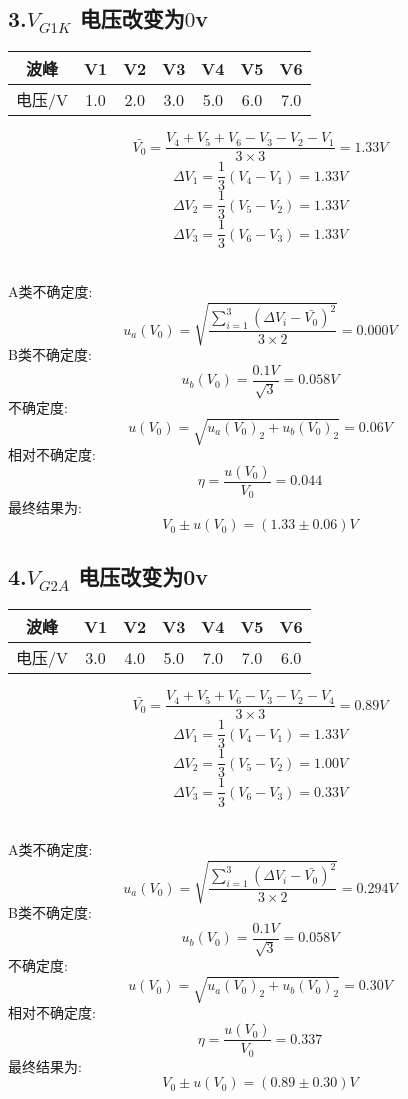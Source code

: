 \documentclass[11pt,a4paper,oneside]{article}
\begin{document}
\subsection*{3.$V_{G1K}$ 电压改变为$0$v}
\begin{center}
\begin{tabular}{|c|c|c|c|c|c|c|}
	\hline
	波峰&V1&V2&V3&V4&V5&V6
	\\\hline
	电压/V&1.0&2.0&3.0&5.0&6.0&7.0\\\hline
	\end{tabular}
	\end{center}

$$  \bar{V_0}=\frac{V_4+V_5+V_6-V_3-V_2-V_1}{3\times 3}=1.33V $$
$$	\Delta V_1=\frac{1}{3}(V_4-V_1)=1.33V $$
$$	\Delta V_2=\frac{1}{3}(V_5-V_2)=1.33V $$
$$	\Delta V_3=\frac{1}{3}(V_6-V_3)=1.33V $$ 

\ \\
A类不确定度:
$$	u_a(V_0)=\sqrt{\frac{\sum\limits_{i=1}^{3} (\Delta V_i-\bar{V_0})^2}{3\times 2}}=0.000V $$
B类不确定度:
$$	u_b(V_0)=\frac{0.1V}{\sqrt{3}}=0.058V $$
不确定度:
$$	u(V_0)=\sqrt{u_a(V_0)_2+u_b(V_0)_2}=0.06V $$
相对不确定度:
$$	\eta=\frac{u(V_0)}{V_0}=0.044 $$
最终结果为:
$$	V_0 \pm u(V_0) = (1.33 \pm 0.06)V $$


\subsection*{4.$V_{G2A}$ 电压改变为0v}
\begin{center}
\begin{tabular}{|c|c|c|c|c|c|c|}
	\hline
	波峰&V1&V2&V3&V4&V5&V6
	\\\hline
	电压/V&3.0&4.0&5.0&7.0&7.0&6.0\\\hline
	\end{tabular}
	\end{center}

$$  \bar{V_0}=\frac{V_4+V_5+V_6-V_3-V_2-V_4}{3\times 3}=0.89V $$
$$	\Delta V_1=\frac{1}{3}(V_4-V_1)=1.33V $$
$$	\Delta V_2=\frac{1}{3}(V_5-V_2)=1.00V $$
$$	\Delta V_3=\frac{1}{3}(V_6-V_3)=0.33V $$ 

\ \\
A类不确定度:
$$	u_a(V_0)=\sqrt{\frac{\sum\limits_{i=1}^{3} (\Delta V_i-\bar{V_0})^2}{3\times 2}}=0.294V $$
B类不确定度:
$$	u_b(V_0)=\frac{0.1V}{\sqrt{3}}=0.058V $$
不确定度:
$$	u(V_0)=\sqrt{u_a(V_0)_2+u_b(V_0)_2}=0.30V $$
相对不确定度:
$$	\eta=\frac{u(V_0)}{V_0}=0.337 $$
最终结果为:
$$	V_0 \pm u(V_0) = (0.89 \pm 0.30)V $$
\end{document}
